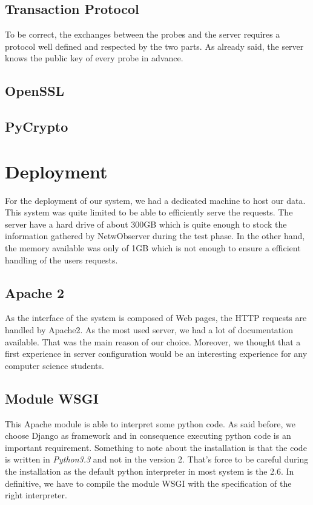 \subsection{Transaction Protocol}
To be correct, the exchanges between the probes and the server requires a protocol well defined and respected by the two parts. As already said, the server knows the public key of every probe in advance. 

\subsection{OpenSSL}

\subsection{PyCrypto}

\section{Deployment}
For the deployment of our system, we had a dedicated machine to host our data. This system was quite limited to be able to efficiently serve the requests. The server have a hard drive of about 300GB which is quite enough to stock the information gathered by NetwObserver during the test phase. In the other hand, the memory available was only of 1GB which is not enough to ensure a efficient handling of the users requests.

\subsection{Apache 2}
As the interface of the system is composed of Web pages, the HTTP requests are handled by Apache2. As the most used server, we had a lot of documentation available. That was the main reason of our choice. Moreover, we thought that a first experience in server configuration would be an interesting experience for any computer science students.

\subsection{Module WSGI}
This Apache module is able to interpret some python code. As said before, we choose Django as framework and in consequence executing python code is an important requirement. Something to note about the installation is that the code is written in \emph{Python3.3} and not in the version 2. That's force to be careful during the installation as the default python interpreter in most system is the 2.6. In definitive, we have to compile the module WSGI with the specification of the right interpreter.

